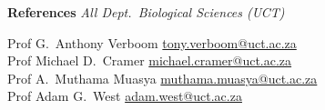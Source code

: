 \documentclass[10pt]{article}
\begin{document}
\begin{multicols}{2} %

\textbf{References} %
                    \hfill {\small \textit{All Dept.~Biological Sciences (UCT)}}

Prof G.~Anthony Verboom
      \hfill     \href{mailto:tony.verboom@uct.ac.za}{tony.verboom@uct.ac.za} \\
Prof Michael D.~Cramer
      \hfill \href{mailto:michael.cramer@uct.ac.za}{michael.cramer@uct.ac.za} \\
Prof A.~Muthama Muasya
      \hfill \href{mailto:muthama.muasya@uct.ac.za}{muthama.muasya@uct.ac.za} \\
Prof Adam G.~West
      \hfill           \href{mailto:adam.west@uct.ac.za}{adam.west@uct.ac.za}

\columnbreak

\end{multicols} %
\end{document}
